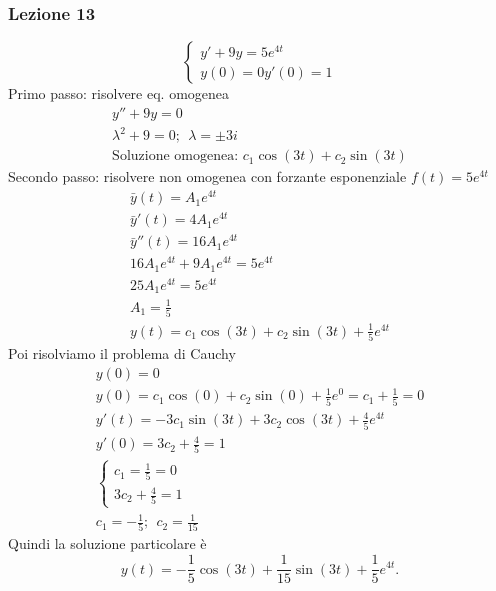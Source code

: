 \subsubsection{Lezione 13}
\begin{esempio}
    \begin{equation}
        \begin{cases}
            y'+9y=5e^{4t} \\
            y(0)=0y'(0)=1
        \end{cases}
    \end{equation}
    Primo passo: risolvere eq. omogenea
    \begin{gather*}
        y''+9y=0 \\
        \lambda^2+9=0;\ \ \lambda=\pm 3i \\
        \text{Soluzione omogenea: }c_1\cos(3t)+c_2\sin(3t)
    \end{gather*}
    Secondo passo: risolvere non omogenea con forzante esponenziale $f(t)=5e^{4t}$
    \begin{gather*}
        \bar{y}(t)=A_1e^{4t} \\
        \bar{y}'(t)=4A_1e^{4t} \\
        \bar{y}''(t)=16A_1e^{4t} \\
        16A_1e^{4t}+9A_1e^{4t}=5e^{4t} \\
        25A_1e^{4t}=5e^{4t} \\
        A_1= \frac{1}{5} \\
    y(t)=c_1\cos(3t)+c_2\sin(3t)+ \frac{1}{5}e^{4t}
    \end{gather*}
    Poi risolviamo il problema di Cauchy
    \begin{gather*}
        y(0)=0 \\
        y(0) = c_1\cos(0) + c_2\sin(0) + \frac{1}{5}e^{0} = c_1+ \frac{1}{5}=0 \\
        y'(t)=-3c_1\sin(3t)+3c_2\cos(3t)+ \frac{4}{5}e^{4t} \\
        y'(0)=3c_2+ \frac{4}{5} = 1 \\
        \begin{cases}
            c_1= \frac{1}{5}=0 \\
            3c_2+ \frac{4}{5}=1
        \end{cases} \\
        c_1 = - \frac{1}{5};\ \ c_2= \frac{1}{15}
    \end{gather*}
    Quindi la soluzione particolare è
    \begin{equation}
        y(t)=- \frac{1}{5}\cos(3t)+ \frac{1}{15}\sin(3t)+ \frac{1}{5}e^{4t}.
    \end{equation}
\end{esempio}
